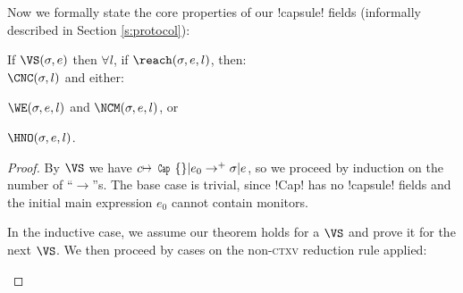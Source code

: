 \noindent Now we formally state the core properties of our \Q!capsule! fields (informally described in Section \ref{s:protocol}):%
\SS\begin{theorem}\rm
If $\VS(\s, e)$ then $\forall l$, if $\reach(\s, e, l)$, then:\\
\indent $\CNC(\s, l)$ and either:
\begin{iitemize}
\item $\WE(\s, e, l)$ and $\NCM(\s, e, l)$, or
\item $\HNO(\s, e, l)$.
\end{iitemize}
\end{theorem}\SS
\begin{proof}
By $\VS$ we have $c\mapsto\Kw{Cap}\{\}|e_0\rightarrow^+ \s|e$, so we proceed by induction on the number of ``$\rightarrow$''s. The base case is trivial, since \Q!Cap! has no \Q!capsule! fields and the initial main expression $e_0$ cannot contain monitors.

In the inductive case, we assume our theorem holds for a $\VS$ and prove it for the next $\VS$. We then proceed by cases on the non-\textsc{ctxv} reduction rule applied:

\begin{ienumerate}


\end{ienumerate}
\end{proof}
